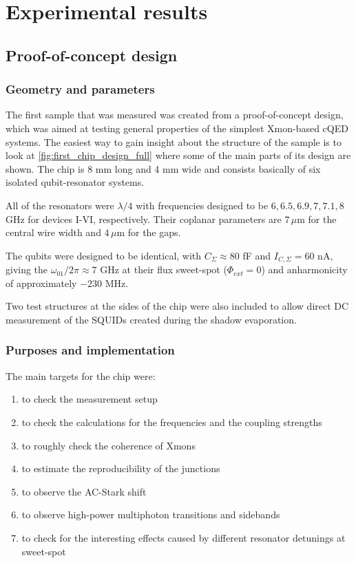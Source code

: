 
\chapter{Experimental results}

\section{Proof-of-concept design}

\subsection{Geometry and parameters}

The first sample that was measured was created from a proof-of-concept design, which was aimed at testing general properties of the simplest Xmon-based cQED systems. The easiest way to gain insight about the structure of the sample is to look at \autoref{fig:first_chip_design_full} where some of the main parts of its design are shown. The chip is 8 mm long and 4 mm wide and consists basically of six isolated qubit-resonator systems. 

All of the resonators were $\lambda/4$ with frequencies designed to be $6, 6.5, 6.9,7,7.1,8$ GHz for devices I-VI, respectively. Their coplanar parameters are $7\,\mu$m for the central wire width and $4\,\mu$m for the gaps.

The qubits were designed to be identical, with $C_\Sigma \approx 80$ fF and $I_{C, \Sigma} = 60$ nA, giving the $\omega_{01}/2\pi \approx 7$ GHz at their flux sweet-spot ($\Phi_{ext}=0$) and anharmonicity of approximately $-230$ MHz.

Two test structures at the sides of the chip were also included to allow direct DC measurement of the SQUIDs created during the shadow evaporation.

\subsection{Purposes and implementation}

The main targets for the chip were:
\begin{enumerate}[label=(\alph*), leftmargin=1.5cm]
\itemsep0pt
 \item to check the measurement setup
 \item to check the calculations for the frequencies and the coupling strengths
 \item to roughly check the coherence of Xmons
 \item to estimate the reproducibility of the junctions 
 \item to observe the AC-Stark shift 
 \item to observe high-power multiphoton transitions and sidebands
 \item to check for the interesting effects caused by different resonator detunings at sweet-spot  
\end{enumerate}

